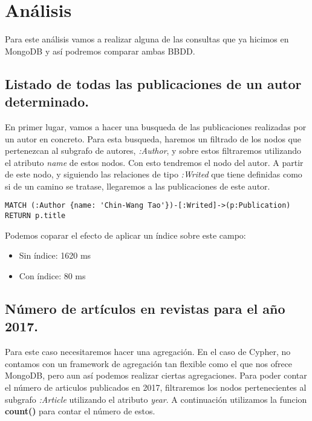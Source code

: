 \section{Análisis}

Para este análisis vamos a realizar alguna de las consultas que ya hicimos en MongoDB y así podremos comparar ambas \gls{BBDD}.

\subsection{Listado de todas las publicaciones de un autor determinado.}

En primer lugar, vamos a hacer una busqueda de las publicaciones realizadas por un autor en concreto. Para esta busqueda, haremos un filtrado de los nodos que pertenezcan al subgrafo de autores, \textit{:Author}, y sobre estos filtraremos utilizando el atributo \textit{name} de estos nodos. Con esto tendremos el nodo del autor. A partir de este nodo, y siguiendo las relaciones de tipo \textit{:Writed} que tiene definidas como si de un camino se tratase, llegaremos a las publicaciones de este autor.

\begin{verbatim}
MATCH (:Author {name: 'Chin-Wang Tao'})-[:Writed]->(p:Publication)
RETURN p.title
\end{verbatim}

Podemos coparar el efecto de aplicar un índice sobre este campo:

\begin{itemize}
 \item Sin índice: 1620 ms
 \item Con índice: 80 ms
\end{itemize}


\subsection{Número de artículos en revistas para el año 2017.}

Para este caso necesitaremos hacer una agregación. En el caso de Cypher, no contamos con un framework de agregación tan flexible como el que nos ofrece MongoDB, pero aun así podemos realizar ciertas agregaciones. Para poder contar el número de articulos publicados en 2017, filtraremos los nodos pertenecientes al subgrafo \textit{:Article} utilizando el atributo \textit{year}. A continuación utilizamos la funcion \textbf{count()} para contar el número de estos.

